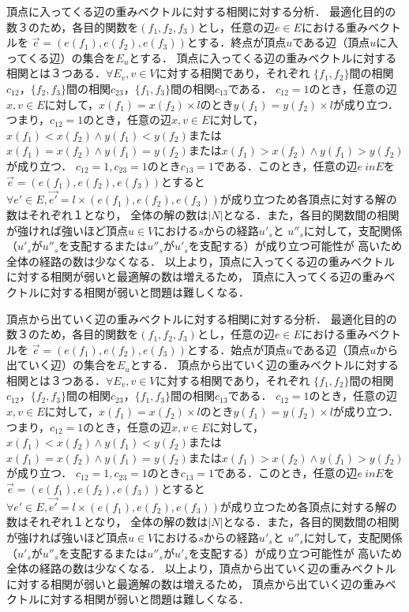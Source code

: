 \documentclass[12pt]{optlab-bachelor}
\begin{document}
頂点に入ってくる辺の重みベクトルに対する相関に対する分析．
最適化目的の数３のため，各目的関数を$(f_1,f_2,f_3)$とし，任意の辺$e　\in E$における重みベクトルを
$\vec{e}=(e(f_1),e(f_2),e(f_3))$とする．終点が頂点$u$である辺（頂点$u$に入ってくる辺）の集合を$E_u$とする．
頂点に入ってくる辺の重みベクトルに対する相関とは３つある．$\forall E_v , v \in V$に対する相関であり，それぞれ
$\{f_1,f_2\}$間の相関$c_{12}$，$\{f_2,f_3\}$間の相関$c_{23}$，$\{f_1,f_3\}$間の相関$c_{13}$である．
$c_{12}=1$のとき，任意の辺$x,v\in E$に対して，$x(f_1)=x(f_2)\times l$のとき$y(f_1)=y(f_2)\times l$が成り立つ．
つまり，$c_{12}=1$のとき，任意の辺$x,v\in E$に対して，$x(f_1)<x(f_2) \land y(f_1)<y(f_2)$または
$x(f_1)=x(f_2) \land y(f_1)=y(f_2)$または$x(f_1)>x(f_2) \land y(f_1)>y(f_2)$が成り立つ．
$c_{12}=1,c_{23}=1$のとき$c_{13}=1$である．このとき，任意の辺$e \ inE$を$\vec{e}=(e(f_1),e(f_2),e(f_3))$とすると
$\forall e'\in E,\vec{e'} = l\times(e(f_1),e(f_2),e(f_3))$が成り立つため各頂点に対する解の数はそれぞれ１となり，
全体の解の数は$|N|$となる．また，各目的関数間の相関が強ければ強いほど頂点$u\in V$における$s$からの経路$u'_{s}$と
$u''_{s}$に対して，支配関係（$u'_{s}$が$u''_{s}$を支配するまたは$u''_{s}$が$u'_{s}$を支配する）が成り立つ可能性が
高いため全体の経路の数は少なくなる．
以上より，頂点に入ってくる辺の重みベクトルに対する相関が弱いと最適解の数は増えるため，
頂点に入ってくる辺の重みベクトルに対する相関が弱いと問題は難しくなる．


頂点から出ていく辺の重みベクトルに対する相関に対する分析．
最適化目的の数３のため，各目的関数を$(f_1,f_2,f_3)$とし，任意の辺$e　\in E$における重みベクトルを
$\vec{e}=(e(f_1),e(f_2),e(f_3))$とする．始点が頂点$u$である辺（頂点$u$から出ていく辺）の集合を$E_u$とする．
頂点から出ていく辺の重みベクトルに対する相関とは３つある．$\forall E_v , v \in V$に対する相関であり，それぞれ
$\{f_1,f_2\}$間の相関$c_{12}$，$\{f_2,f_3\}$間の相関$c_{23}$，$\{f_1,f_3\}$間の相関$c_{13}$である．
$c_{12}=1$のとき，任意の辺$x,v\in E$に対して，$x(f_1)=x(f_2)\times l$のとき$y(f_1)=y(f_2)\times l$が成り立つ．
つまり，$c_{12}=1$のとき，任意の辺$x,v\in E$に対して，$x(f_1)<x(f_2) \land y(f_1)<y(f_2)$または
$x(f_1)=x(f_2) \land y(f_1)=y(f_2)$または$x(f_1)>x(f_2) \land y(f_1)>y(f_2)$が成り立つ．
$c_{12}=1,c_{23}=1$のとき$c_{13}=1$である．このとき，任意の辺$e \ inE$を$\vec{e}=(e(f_1),e(f_2),e(f_3))$とすると
$\forall e'\in E,\vec{e'} = l\times(e(f_1),e(f_2),e(f_3))$が成り立つため各頂点に対する解の数はそれぞれ１となり，
全体の解の数は$|N|$となる．また，各目的関数間の相関が強ければ強いほど頂点$u\in V$における$s$からの経路$u'_{s}$と
$u''_{s}$に対して，支配関係（$u'_{s}$が$u''_{s}$を支配するまたは$u''_{s}$が$u'_{s}$を支配する）が成り立つ可能性が
高いため全体の経路の数は少なくなる．
以上より，頂点から出ていく辺の重みベクトルに対する相関が弱いと最適解の数は増えるため，
頂点から出ていく辺の重みベクトルに対する相関が弱いと問題は難しくなる．
\end{document}
